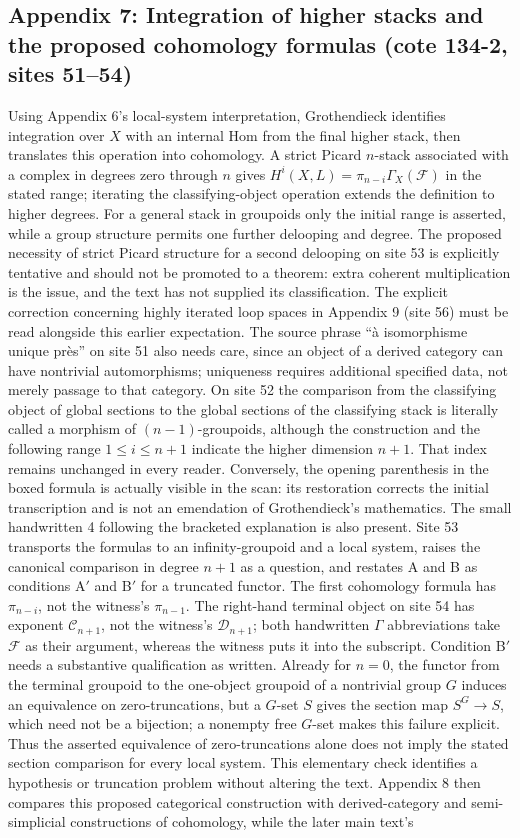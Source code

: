 \documentclass[10pt,oneside]{book}
\begin{document}
\subsection*{Appendix 7: Integration of higher stacks and the proposed cohomology formulas (cote 134-2, sites 51--54)}
Using Appendix 6's local-system interpretation, Grothendieck identifies integration over $X$ with an internal Hom from the final higher stack, then translates this operation into cohomology. A strict Picard $n$-stack associated with a complex in degrees zero through $n$ gives $H^i(X,L)=\pi_{n-i}\Gamma_X(\mathcal F)$ in the stated range; iterating the classifying-object operation extends the definition to higher degrees. For a general stack in groupoids only the initial range is asserted, while a group structure permits one further delooping and degree. The proposed necessity of strict Picard structure for a second delooping on site 53 is explicitly tentative and should not be promoted to a theorem: extra coherent multiplication is the issue, and the text has not supplied its classification. The explicit correction concerning highly iterated loop spaces in Appendix 9 (site 56) must be read alongside this earlier expectation. The source phrase ``à isomorphisme unique près'' on site 51 also needs care, since an object of a derived category can have nontrivial automorphisms; uniqueness requires additional specified data, not merely passage to that category. On site 52 the comparison from the classifying object of global sections to the global sections of the classifying stack is literally called a morphism of $(n-1)$-groupoids, although the construction and the following range $1\leq i\leq n+1$ indicate the higher dimension $n+1$. That index remains unchanged in every reader. Conversely, the opening parenthesis in the boxed formula is actually visible in the scan: its restoration corrects the initial transcription and is not an emendation of Grothendieck's mathematics. The small handwritten 4 following the bracketed explanation is also present. Site 53 transports the formulas to an infinity-groupoid and a local system, raises the canonical comparison in degree $n+1$ as a question, and restates A and B as conditions A$'$ and B$'$ for a truncated functor. The first cohomology formula has $\pi_{n-i}$, not the witness's $\pi_{n-1}$. The right-hand terminal object on site 54 has exponent $\mathcal C_{n+1}$, not the witness's $\mathcal D_{n+1}$; both handwritten $\Gamma$ abbreviations take $\mathcal F$ as their argument, whereas the witness puts it into the subscript. Condition B$'$ needs a substantive qualification as written. Already for $n=0$, the functor from the terminal groupoid to the one-object groupoid of a nontrivial group $G$ induces an equivalence on zero-truncations, but a $G$-set $S$ gives the section map $S^G\to S$, which need not be a bijection; a nonempty free $G$-set makes this failure explicit. Thus the asserted equivalence of zero-truncations alone does not imply the stated section comparison for every local system. This elementary check identifies a hypothesis or truncation problem without altering the text. Appendix 8 then compares this proposed categorical construction with derived-category and semi-simplicial constructions of cohomology, while the later main text's 
\end{document}
